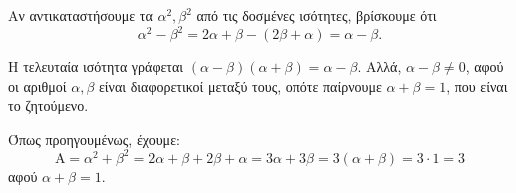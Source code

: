 
\begin{alist}
\item 
\begin{rlist}
\item Αν αντικαταστήσουμε τα $\alpha^2, \beta^2$ από τις δοσμένες ισότητες, βρίσκουμε ότι
\[\alpha^2 - \beta^2 = 2\alpha + \beta - (2\beta + \alpha) = \alpha - \beta.\]
\item H τελευταία ισότητα γράφεται $(\alpha - \beta)(\alpha + \beta) = \alpha - \beta$. Αλλά, $\alpha - \beta \ne 0$, αφού οι αριθμοί $\alpha, \beta$ είναι διαφορετικοί μεταξύ τους, οπότε παίρνουμε $\alpha + \beta = 1$, που είναι το ζητούμενο.
\end{rlist}

\item Όπως προηγουμένως, έχουμε:
\[\text{A} = \alpha^2 + \beta^2 = 2\alpha + \beta + 2\beta + \alpha = 3\alpha + 3\beta = 3(\alpha + \beta) = 3 \cdot 1 = 3\]
αφού $\alpha + \beta = 1$.
\end{alist}

